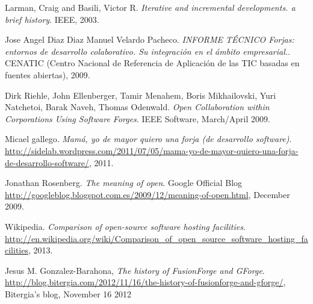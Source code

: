 \documentclass[a4paper, 12pt]{book}
\begin{document}



\begin{comment}
    Referenciar bibliografía: reference 1 ~\cite{New-commercial-OSS-standford-2010}.
\end{comment}

\begin{thebibliography}{25}


 Larman, Craig and Basili, Victor R. \textit{Iterative and incremental developments. a brief history}. IEEE, 2003.


 Jose Angel Diaz Diaz Manuel Velardo Pacheco. \textit{INFORME TÉCNICO Forjas: entornos de desarrollo colaborativo. Su integración en el ámbito empresarial.}. CENATIC (Centro Nacional de Referencia de Aplicación de las TIC basadas en fuentes abiertas), 2009.

 Dirk Riehle, John Ellenberger, Tamir Menahem, Boris Mikhailovski, Yuri Natchetoi, Barak Naveh, Thomas Odenwald. \textit{Open Collaboration within Corporations Using Software Forges}. IEEE Software, March/April 2009.

 Micael gallego. \textit{Mamá, yo de mayor quiero una forja (de desarrollo software)}. \url{http://sidelab.wordpress.com/2011/07/05/mama-yo-de-mayor-quiero-una-forja-de-desarrollo-software/}, 2011.

 Jonathan Rosenberg. \textit{The meaning of open}. Google Official Blog \url{http://googleblog.blogspot.com.es/2009/12/meaning-of-open.html}, December 2009.

 Wikipedia. \textit{Comparison of open-source software hosting facilities}. \url{http://en.wikipedia.org/wiki/Comparison_of_open_source_software_hosting_facilities}, 2013.

 Jesus M. Gonzalez-Barahona, \textit{The history of FusionForge and GForge}. \url{http://blog.bitergia.com/2012/11/16/the-history-of-fusionforge-and-gforge/}, Bitergia's blog, November 16 2012

\end{thebibliography}
\end{document}
